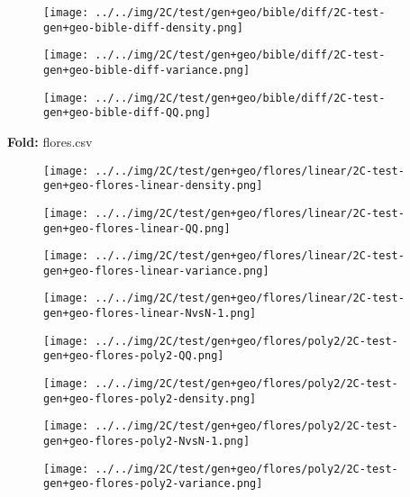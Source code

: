 \begin{figure}[H]
\centering	\texttt{[image: ../../img/2C/test/gen+geo/bible/diff/2C-test-gen+geo-bible-diff-density.png]}
\end{figure}
\begin{figure}[H]
\centering	\texttt{[image: ../../img/2C/test/gen+geo/bible/diff/2C-test-gen+geo-bible-diff-variance.png]}
\end{figure}
\begin{figure}[H]
\centering	\texttt{[image: ../../img/2C/test/gen+geo/bible/diff/2C-test-gen+geo-bible-diff-QQ.png]}
\end{figure}
\textbf{Fold:} flores.csv
\begin{figure}[H]
\centering	\texttt{[image: ../../img/2C/test/gen+geo/flores/linear/2C-test-gen+geo-flores-linear-density.png]}
\end{figure}
\begin{figure}[H]
\centering	\texttt{[image: ../../img/2C/test/gen+geo/flores/linear/2C-test-gen+geo-flores-linear-QQ.png]}
\end{figure}
\begin{figure}[H]
\centering	\texttt{[image: ../../img/2C/test/gen+geo/flores/linear/2C-test-gen+geo-flores-linear-variance.png]}
\end{figure}
\begin{figure}[H]
\centering	\texttt{[image: ../../img/2C/test/gen+geo/flores/linear/2C-test-gen+geo-flores-linear-NvsN-1.png]}
\end{figure}
\begin{figure}[H]
\centering	\texttt{[image: ../../img/2C/test/gen+geo/flores/poly2/2C-test-gen+geo-flores-poly2-QQ.png]}
\end{figure}
\begin{figure}[H]
\centering	\texttt{[image: ../../img/2C/test/gen+geo/flores/poly2/2C-test-gen+geo-flores-poly2-density.png]}
\end{figure}
\begin{figure}[H]
\centering	\texttt{[image: ../../img/2C/test/gen+geo/flores/poly2/2C-test-gen+geo-flores-poly2-NvsN-1.png]}
\end{figure}
\begin{figure}[H]
\centering	\texttt{[image: ../../img/2C/test/gen+geo/flores/poly2/2C-test-gen+geo-flores-poly2-variance.png]}
\end{figure}
